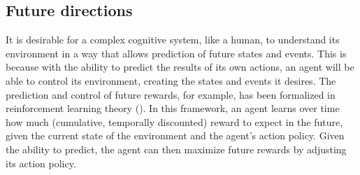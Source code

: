 \documentclass{article}
\begin{document}
\subsection{Future directions}

It is desirable for a complex cognitive system, like a human, to understand its environment in a way that allows prediction of future states and events. This is because with the ability to predict the results of its own actions, an agent will be able to control its environment, creating the states and events it desires. The prediction and control of future rewards, for example, has been formalized in reinforcement learning theory (\cite{sutton_reinforcement_2017}). In this framework, an agent learns over time how much (cumulative, temporally discounted) reward to expect in the future, given the current state of the environment and the agent's action policy. Given the ability to predict, the agent can then maximize future rewards by adjusting its action policy.
\end{document}
